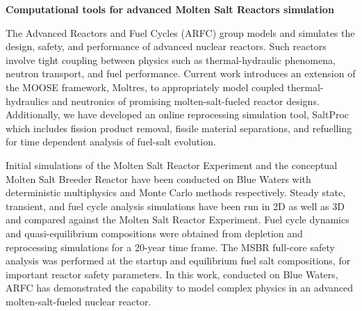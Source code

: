 \documentclass[11pt]{article}
\newcommand{\authorname}{Kathryn~D.~Huff }
\newcommand{\authorsite}{arfc.npre.illinois.edu}
\begin{document}
\pagestyle{fancy}
\lhead{\textcolor{gray}{Investigator: Prof. \authorname\\Presenter: Mr. Andrei Rykhlevskii}}
\rhead{\textcolor{gray}{University of Illinois at Urbana-Champaign\\}}
\renewcommand{\headrulewidth}{0pt}
\renewcommand{\footrulewidth}{0pt}
\fancyfoot[C]{\footnotesize \textcolor{gray}{\authorsite}}
   \begin{center}
      \Large\textbf{Computational tools for advanced Molten Salt Reactors simulation}\\
   \end{center}

The Advanced Reactors and Fuel Cycles (ARFC) group models and simulates the design, safety, and performance of advanced nuclear reactors. Such reactors  involve tight coupling between physics such as thermal-hydraulic phenomena, neutron transport, and fuel performance. Current work introduces an extension of the MOOSE framework, Moltres, to appropriately model coupled thermal-hydraulics and neutronics of promising molten-salt-fueled reactor designs. Additionally, we have developed an online reprocessing simulation tool, SaltProc which includes fission product removal, fissile material separations, and refuelling for time dependent analysis of fuel-salt evolution. 

Initial simulations of the Molten Salt Reactor Experiment and the conceptual 
Molten Salt Breeder Reactor have been conducted on Blue Waters with deterministic multiphysics and Monte Carlo methods respectively. Steady state, transient, and fuel cycle analysis simulations have been run in 2D as well as 3D and compared against the Molten Salt Reactor Experiment. Fuel cycle dynamics and quasi-equilibrium compositions were obtained from depletion and reprocessing simulations for a 20-year time frame. The MSBR full-core safety analysis was performed at the startup and equilibrium fuel salt compositions, for important reactor safety parameters. In this work, conducted on Blue Waters, ARFC has demonstrated the capability to model complex physics in an advanced molten-salt-fueled nuclear reactor.
\end{document}
